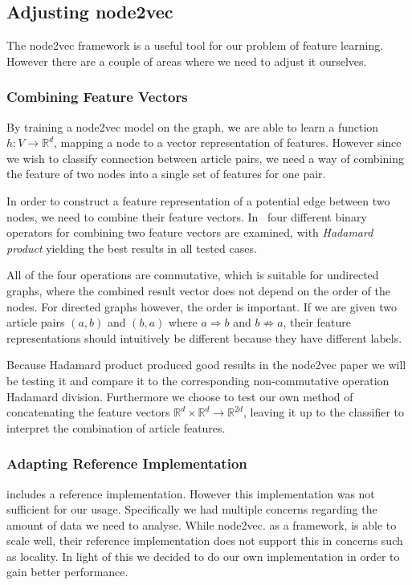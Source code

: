\subsection{Adjusting node2vec}
The node2vec framework is a useful tool for our problem of feature learning. However there are a couple of areas where we need to adjust it ourselves.

\subsubsection{Combining Feature Vectors}
By training a node2vec model on the graph, we are able to learn a function $h:V \to \mathbb{R}^d$, mapping a node to a vector representation of features. However since we wish to classify connection between article pairs, we need a way of combining the feature of two nodes into a single set of features for one pair.

In order to construct a feature representation of a potential edge between two nodes, we need to combine their feature vectors. In~\cite{node2vec} four different binary operators for combining two feature vectors are examined, with \emph{Hadamard product} yielding the best results in all tested cases.

All of the four operations are commutative, which is suitable for undirected graphs, where the combined result vector does not depend on the order of the nodes. For directed graphs however, the order is important. If we are given two article pairs $(a,b)$ and $(b,a)$ where $a \Rightarrow b$ and $b \not \Rightarrow a$, their feature representations should intuitively be different because they have different labels. 

Because Hadamard product produced good results in the node2vec paper we will be testing it and compare it to the corresponding non-commutative operation Hadamard division. Furthermore we choose to test our own method of concatenating the feature vectors $\mathbb{R}^d \times \mathbb{R}^d \to \mathbb{R}^{2d}$, leaving it up to the classifier to interpret the combination of article features.


\subsubsection{Adapting Reference Implementation}
\cite{node2vec} includes a reference implementation. However this implementation was not sufficient for our usage. Specifically we had multiple concerns regarding the amount of data we need to analyse. While node2vec. as a framework, is able to scale well, their reference implementation does not support this in concerns such as locality. In light of this we decided to do our own implementation in order to gain better performance.


